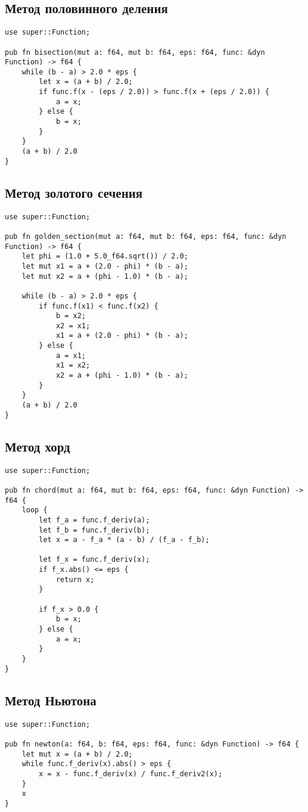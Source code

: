 \subsection{Метод половинного деления}
\begin{lstlisting}
use super::Function;

pub fn bisection(mut a: f64, mut b: f64, eps: f64, func: &dyn Function) -> f64 {
    while (b - a) > 2.0 * eps {
        let x = (a + b) / 2.0;
        if func.f(x - (eps / 2.0)) > func.f(x + (eps / 2.0)) {
            a = x;
        } else {
            b = x;
        }
    }
    (a + b) / 2.0
}
\end{lstlisting}

\subsection{Метод золотого сечения}
\begin{lstlisting}
use super::Function;

pub fn golden_section(mut a: f64, mut b: f64, eps: f64, func: &dyn Function) -> f64 {
    let phi = (1.0 + 5.0_f64.sqrt()) / 2.0;
    let mut x1 = a + (2.0 - phi) * (b - a);
    let mut x2 = a + (phi - 1.0) * (b - a);

    while (b - a) > 2.0 * eps {
        if func.f(x1) < func.f(x2) {
            b = x2;
            x2 = x1;
            x1 = a + (2.0 - phi) * (b - a);
        } else {
            a = x1;
            x1 = x2;
            x2 = a + (phi - 1.0) * (b - a);
        }
    }
    (a + b) / 2.0
}
\end{lstlisting}

\subsection{Метод хорд}
\begin{lstlisting}
use super::Function;

pub fn chord(mut a: f64, mut b: f64, eps: f64, func: &dyn Function) -> f64 {
    loop {
        let f_a = func.f_deriv(a);
        let f_b = func.f_deriv(b);
        let x = a - f_a * (a - b) / (f_a - f_b);

        let f_x = func.f_deriv(x);
        if f_x.abs() <= eps {
            return x;
        }

        if f_x > 0.0 {
            b = x;
        } else {
            a = x;
        }
    }
}
\end{lstlisting}

\subsection{Метод Ньютона}
\begin{lstlisting}
use super::Function;

pub fn newton(a: f64, b: f64, eps: f64, func: &dyn Function) -> f64 {
    let mut x = (a + b) / 2.0;
    while func.f_deriv(x).abs() > eps {
        x = x - func.f_deriv(x) / func.f_deriv2(x);
    }
    x
}
\end{lstlisting}